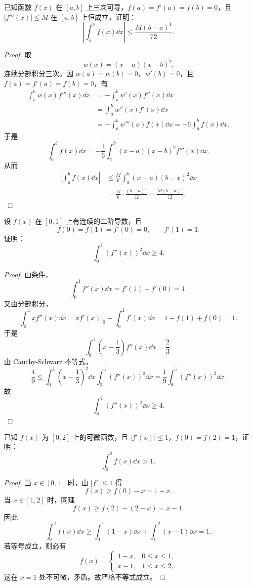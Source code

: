\begin{problem}
	已知函数 $f(x)$ 在 $[a,b]$ 上三次可导，$f(a)=f'(a)=f(b)=0$，且 $|f'''(x)|\leqslant M$ 在 $[a,b]$ 上恒成立，证明：
	\[
	\left|\int_a^b f(x)\dd x\right|\leqslant \frac{M(b-a)^4}{72}.
	\]
\end{problem}

\begin{proof}
	取
	\[
	w(x)=(x-a)(x-b)^2.
	\]
	连续分部积分三次。因 $w(a)=w(b)=0$，$w'(b)=0$，且 $f(a)=f'(a)=f(b)=0$，有
	\[
	\begin{aligned}
		\int_a^b w(x)f'''(x)\dd x
		&=-\int_a^b w'(x)f''(x)\dd x\\
		&=\int_a^b w''(x)f'(x)\dd x\\
		&=-\int_a^b w'''(x)f(x)\dd x
		=-6\int_a^b f(x)\dd x.
	\end{aligned}
	\]
	于是
	\[
	\int_a^b f(x)\dd x=-\frac16\int_a^b (x-a)(x-b)^2 f'''(x)\dd x.
	\]
	从而
	\[
	\begin{aligned}
		\left|\int_a^b f(x)\dd x\right|
		&\leqslant \frac{M}{6}\int_a^b (x-a)(b-x)^2\dd x\\
		&=\frac{M}{6}\cdot\frac{(b-a)^4}{12}
		=\frac{M(b-a)^4}{72}.
	\end{aligned}
	\]
\end{proof}

\begin{problem}
	设 $f(x)$ 在 $[0,1]$ 上有连续的二阶导数，且
	\[
	f(0)=f(1)=f'(0)=0,\qquad f'(1)=1.
	\]
	证明：
	\[
	\int_0^1 \left(f''(x)\right)^2\dd x\geqslant4.
	\]
\end{problem}

\begin{proof}
	由条件，
	\[
	\int_0^1 f''(x)\dd x=f'(1)-f'(0)=1.
	\]
	又由分部积分，
	\[
	\int_0^1 x f''(x)\dd x
	=xf'(x)\bigg|_0^1-\int_0^1 f'(x)\dd x
	=1-f(1)+f(0)=1.
	\]
	于是
	\[
	\int_0^1 \left(x-\frac13\right)f''(x)\dd x=\frac23.
	\]
	由 Cauchy-Schwarz 不等式，
	\[
	\frac49
	\leqslant \int_0^1\left(x-\frac13\right)^2\dd x\int_0^1\left(f''(x)\right)^2\dd x
	=\frac19\int_0^1\left(f''(x)\right)^2\dd x.
	\]
	故
	\[
	\int_0^1\left(f''(x)\right)^2\dd x\geqslant4.
	\]
\end{proof}

\begin{problem}
	已知 $f(x)$ 为 $[0,2]$ 上的可微函数，且 $|f'(x)|\leqslant1$，$f(0)=f(2)=1$，证明：
	\[
	\int_0^2 f(x)\dd x>1.
	\]
\end{problem}

\begin{proof}
	当 $x\in[0,1]$ 时，由 $|f'|\leqslant1$ 得
	\[
	f(x)\geqslant f(0)-x=1-x.
	\]
	当 $x\in[1,2]$ 时，同理
	\[
	f(x)\geqslant f(2)-(2-x)=x-1.
	\]
	因此
	\[
	\int_0^2 f(x)\dd x
	\geqslant \int_0^1(1-x)\dd x+\int_1^2(x-1)\dd x=1.
	\]
	若等号成立，则必有
	\[
	f(x)=
	\begin{cases}
		1-x,&0\leqslant x\leqslant1,\\
		x-1,&1\leqslant x\leqslant2,
	\end{cases}
	\]
	这在 $x=1$ 处不可微，矛盾。故严格不等式成立。
\end{proof}

